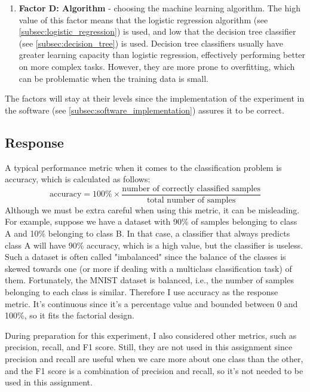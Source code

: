 \documentclass{article}
\begin{document}
\begin{enumerate}
    \item \textbf{Factor D: Algorithm} - choosing the machine learning algorithm. The high value of this factor means that the logistic regression algorithm (see \ref{subsec:logistic_regression}) is used, and low that the decision tree classifier (see \ref{subsec:decision_tree}) is used. Decision tree classifiers usually have greater learning capacity than logistic regression, effectively performing better on more complex tasks. However, they are more prone to overfitting, which can be problematic when the training data is small.
\end{enumerate}

The factors will stay at their levels since the implementation of the experiment in the software (see \ref{subsec:software_implementation}) assures it to be correct.

\subsection{Response}
A typical performance metric when it comes to the classification problem is accuracy, which is calculated as follows:
\begin{equation}
    \text{accuracy} = 100\%\times\frac{\text{number of correctly classified samples}}{\text{total number of samples}}
\end{equation}
Although we must be extra careful when using this metric, it can be misleading. For example, suppose we have a dataset with 90\% of samples belonging to class A and 10\% belonging to class B. In that case, a classifier that always predicts class A will have 90\% accuracy, which is a high value, but the classifier is useless. Such a dataset is often called "imbalanced" since the balance of the classes is skewed towards one (or more if dealing with a multiclass classification task) of them. Fortunately, the MNIST dataset is balanced, i.e., the number of samples belonging to each class is similar. Therefore I use accuracy as the response metric. It's continuous since it's a percentage value and bounded between 0 and 100\%, so it fits the factorial design.

During preparation for this experiment, I also considered other metrics, such as precision, recall, and F1 score. Still, they are not used in this assignment since precision and recall are useful when we care more about one class than the other, and the F1 score is a combination of precision and recall, so it's not needed to be used in this assignment.
\end{document}

